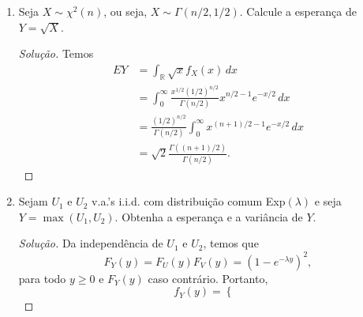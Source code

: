 \documentclass[../Notas.tex]{subfiles}
\begin{document}
\begin{enumerate}
\begin{proof}[Solução]
\begin{enumerate}[a)]
\begin{align*}
                \, dx \, dy \\
                &= \frac{\lambda^{\alpha_1}}{\Gamma(\alpha_1)}\cdot
                \frac{\alpha_2(\alpha_2+1)}{\lambda^2}
                \int_0^{\infty} x^{\alpha_1 - 2 - 1} e^{-\lambda x} \, dx \\
                &= \frac{\lambda^{\alpha_1-1}}{\Gamma(\alpha_1)}\alpha_2(\alpha_2+1)
                \cdot\frac{\Gamma(\alpha_1-2)}{\lambda^{\alpha_1-2}} \\
                &= \frac{\alpha_2(\alpha_2+1)}{(\alpha_1-1)(\alpha_1-2)},
            \end{align*}
            onde impomos a condição $\alpha_1 > 2$ para que a integral exista. Daí,
            temos
            \[
            \Var(Z) = \frac{\alpha_2(\alpha_2+1)}{(\alpha_1-1)(\alpha_1-2)}
            - \frac{\alpha_2}{(\alpha_1 - 1)^2}
            = \frac{\alpha_2(\alpha_1+\alpha_2-1)}{(\alpha_1-1)^2(\alpha_1-2)}.
            \]
        \end{enumerate}
    \end{proof}
    \item Seja $X\sim\chi^2(n)$, ou seja, $X\sim\Gamma(n/2,1/2)$. Calcule a esperança de $Y = \sqrt{X}$.
    \begin{proof}[Solução]
        Temos
        \begin{align*}
            EY &= \int_{\mathbb{R}} \sqrt{x}f_X(x) \, dx \\
               &= \int_0^{\infty} \frac{x^{1/2}(1/2)^{n/2}}{\Gamma(n/2)}
               x^{n/2 - 1}e^{-x/2} \, dx \\
               &= \frac{(1/2)^{n/2}}{\Gamma(n/2)}\int_0^{\infty} x^{(n+1)/2 - 1}
               e^{-x/2} \, dx \\
               &= \sqrt{2}\frac{\Gamma((n+1)/2)}{\Gamma(n/2)}.
        \end{align*}
    \end{proof}
    \item Sejam $U_1$ e $U_2$ v.a.’s i.i.d. com distribuição comum Exp$(\lambda)$ e seja $Y = \max(U_1,U_2)$. Obtenha a esperança e a variância de $Y$.
    \begin{proof}[Solução]
        Da independência de $U_1$ e $U_2$, temos que
        \[
        F_Y(y) = F_U(y)F_V(y) = (1 - e^{-\lambda y})^2,
        \]
        para todo $y\geq 0$ e $F_Y(y)$ caso contrário. Portanto,
        \[
        f_Y(y) = \begin{cases}

\end{cases}\]
\end{proof}
\end{enumerate}
\end{document}
